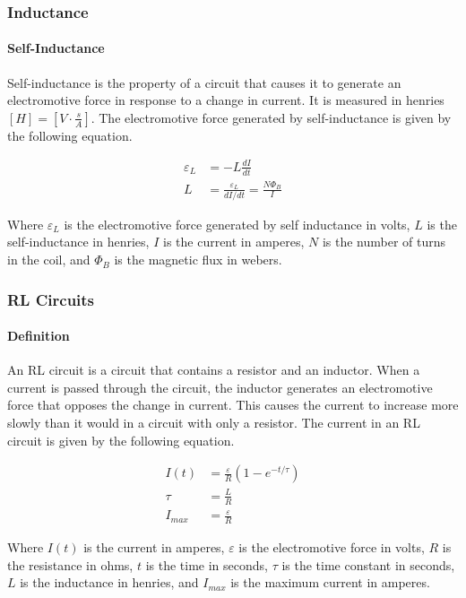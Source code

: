 \subsubsection*{Inductance}
\hrulefill

\paragraph*{Self-Inductance}
Self-inductance is the property of a circuit that causes it to generate an electromotive force in response to a change in current. It is measured in henries 
$[H] = [V\cdot \frac{s}{A}]$. The electromotive force generated by self-inductance is given by the following equation.

\begin{align*}
    \varepsilon_L &= -L\frac{dI}{dt}\\
    L &= \frac{\varepsilon_L}{dI/dt} = \frac{N\Phi_B}{I}
\end{align*}

Where $\varepsilon_L$ is the electromotive force generated by self inductance in volts, $L$ is the self-inductance in henries, $I$ is the current in amperes, 
$N$ is the number of turns in the coil, and $\Phi_B$ is the magnetic flux in webers.\\

\subsubsection*{RL Circuits}
\paragraph*{Definition}
An RL circuit is a circuit that contains a resistor and an inductor. When a current is passed through the circuit, the inductor generates
an electromotive force that opposes the change in current. This causes the current to increase more slowly than it would in a circuit with
only a resistor. The current in an RL circuit is given by the following equation.

\begin{align*}
    I(t) &= \frac{\varepsilon}{R}(1 - e^{-t/\tau})\\
    \tau &= \frac{L}{R}\\
    I_{max} &= \frac{\varepsilon}{R} 
\end{align*}

Where $I(t)$ is the current in amperes, $\varepsilon$ is the electromotive force in volts, $R$ is the resistance in ohms, $t$ is the time in seconds,
$\tau$ is the time constant in seconds, $L$ is the inductance in henries, and $I_{max}$ is the maximum current in amperes.\\



